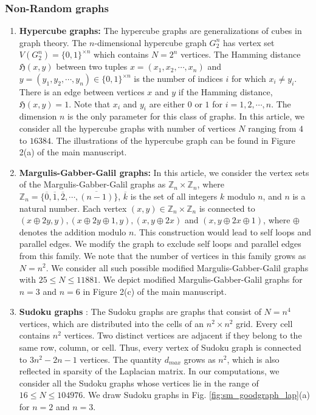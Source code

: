 \documentclass[%
 reprint,
 superscriptaddress,
 amsmath,amssymb,
 aps,
 pra,
floatfix,
nofootinbib,
]{revtex4-2}
\theoremstyle{definition}
\theoremstyle{remark}
\begin{document}
\begin{appendix}
    \subsubsection{Non-Random graphs}
    \label{Non_Random_graphs_Laplacian}
	\begin{enumerate}
		\item 
		\textbf{Hypercube graphs:} The hypercube graphs are generalizations of cubes in graph theory. The $n$-dimensional hypercube graph $G_2^n$ has vertex set $V(G_2^n) = \{0, 1\}^{\times n}$ which contains $N=2^n$ vertices. The Hamming distance $\mathfrak{H}(x, y)$ between two tuples $x = (x_1, x_2, \cdots, x_n)$ and $y = (y_1, y_2, \cdots, y_n) \in \{0, 1\}^{\times n}$ is the number of indices $i$ for which $x_i \neq y_i$. There is an edge between vertices $x$ and $y$ if the Hamming distance, $\mathfrak{H}(x, y) = 1$. Note that $x_i$ and $y_i$ are either $0$ or $1$ for $i = 1, 2, \cdots, n$. The dimension $n$ is the only parameter for this class of graphs. In this article, we consider all the hypercube graphs with number of vertices $N$ ranging from $4$ to $16384$. The illustrations of the hypercube graph can be found in Figure 2(a) of the main manuscript.  
		\item 
		\textbf{Margulis-Gabber-Galil graphs:} In this article, we consider the vertex sets of the Margulis-Gabber-Galil graphs as  $\mathbb{Z}_n \times \mathbb{Z}_n$, where $\mathbb{Z}_n = \{\overline{0}, \overline{1}, \overline{2}, \cdots, \overline{(n - 1)}\}$, $\overline{k}$ is the set of all integers $k$ modulo $n$, and $n$ is a natural number. Each vertex $(x,y) \in \mathbb{Z}_n \times \mathbb{Z}_n $ is connected to $(x \oplus 2y, y), (x \oplus 2y \oplus 1, y), (x, y \oplus 2x)$ and $(x, y \oplus 2x \oplus 1)$, where $ \oplus $ denotes the addition modulo $n$. This construction would lead to self loops and parallel edges. We modify the graph to exclude self loops and parallel edges from this family. We note that the number of vertices in this family grows as $N=n^2$. We consider all such possible modified Margulis-Gabber-Galil graphs with $25 \leq N \leq 11881$. We depict modified Margulis-Gabber-Galil  graphs for $n = 3$ and $n= 6$ in Figure 2(c) of the main manuscript. 
		
		\item 
		\textbf{Sudoku graphs} \cite{herzberg2007sudoku}: The Sudoku graphs are graphs that consist of $N=n^4$ vertices, which are distributed into the cells of an $n^2 \times n^2$ grid. Every cell contains $n^2$ vertices. Two distinct vertices are adjacent if they belong to the same row, column, or cell. Thus, every vertex of Sudoku graph is connected to $3n^2-2n-1$ vertices. The quantity $d_{max}$ grows as $n^2$, which is also reflected in sparsity of the Laplacian matrix. In our computations, we consider all the Sudoku graphs whose vertices lie in the range of  $ 16\leq N \leq 104976$. We draw Sudoku graphs in Fig. \ref{fig:sm_goodgraph_lap}(a) for $n =2 $ and $n=3$.
		

\end{enumerate}
\end{appendix}
\end{document}
